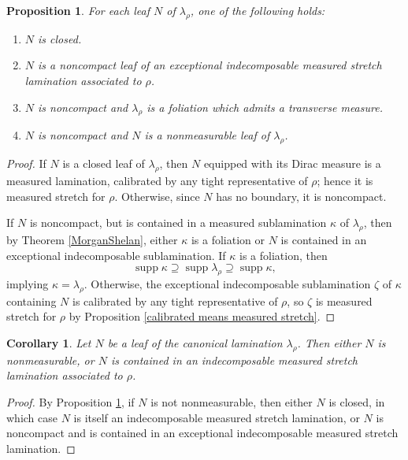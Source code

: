 \documentclass[reqno,11pt]{amsart}
\DeclareMathOperator{\supp}{supp}
\newtheorem{proposition}[theorem]{Proposition}
\newtheorem{corollary}[theorem]{Corollary}
\theoremstyle{definition}
\numberwithin{equation}{section}
\begin{document}
\begin{proposition}\label{classification of leaves}
For each leaf $N$ of $\lambda_\rho$, one of the following holds:
\begin{enumerate}
\item $N$ is closed.
\item $N$ is a noncompact leaf of an exceptional indecomposable measured stretch lamination associated to $\rho$.
\item $N$ is noncompact and $\lambda_\rho$ is a foliation which admits a transverse measure.
\item $N$ is noncompact and $N$ is a nonmeasurable leaf of $\lambda_\rho$.
\end{enumerate}
\end{proposition}
\begin{proof}
If $N$ is a closed leaf of $\lambda_\rho$, then $N$ equipped with its Dirac measure is a measured lamination, calibrated by any tight representative of $\rho$; hence it is measured stretch for $\rho$.
Otherwise, since $N$ has no boundary, it is noncompact.

If $N$ is noncompact, but is contained in a measured sublamination $\kappa$ of $\lambda_\rho$, then by Theorem \ref{MorganShelan}, either $\kappa$ is a foliation or $N$ is contained in an exceptional indecomposable sublamination.
If $\kappa$ is a foliation, then
$$\supp \kappa \supseteq \supp \lambda_\rho \supseteq \supp \kappa,$$
implying $\kappa = \lambda_\rho$.
Otherwise, the exceptional indecomposable sublamination $\zeta$ of $\kappa$ containing $N$ is calibrated by any tight representative of $\rho$, so $\zeta$ is measured stretch for $\rho$ by Proposition \ref{calibrated means measured stretch}.
\end{proof}

\begin{corollary}\label{measurable leaves are contained in indecomposables}
Let $N$ be a leaf of the canonical lamination $\lambda_\rho$.
Then either $N$ is nonmeasurable, or $N$ is contained in an indecomposable measured stretch lamination associated to $\rho$.
\end{corollary}
\begin{proof}
By Proposition \ref{classification of leaves}, if $N$ is not nonmeasurable, then either $N$ is closed, in which case $N$ is itself an indecomposable measured stretch lamination, or $N$ is noncompact and is contained in an exceptional indecomposable measured stretch lamination.
\end{proof}
\end{document}
